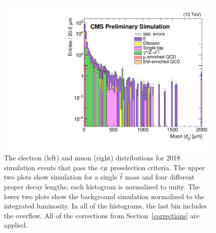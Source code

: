 \begin{figure}
\includegraphics[scale=0.3]{figures/selection/preselection/bg/muonAbsD0_2000um.pdf}
\caption{The electron (left) and muon (right) \ad distributions for 2018 simulation events that pass the $e{\mu}$ preselection criteria. The upper two plots show \stoptolb simulation for a single $\widetilde{t}$ mass and four different proper decay lengths; each histogram is normalized to unity. The lower two plots show the background simulation normalized to the integrated luminosity. In all of the histograms, the last bin includes the overflow. All of the corrections from Section~\ref{corrections} are applied.}
\label{preselection_d0}
\end{figure}